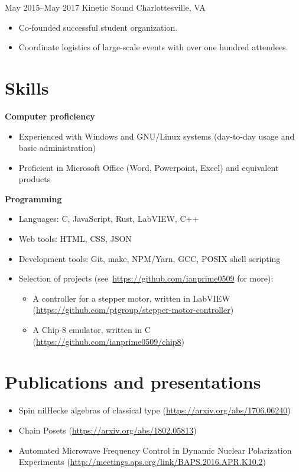 \documentclass[10pt]{article}
\begin{document}
{May 2015--May 2017}
{Kinetic Sound}
{Charlottesville, VA}
\begin{itemize}
\item Co-founded successful student organization.
\item Coordinate logistics of large-scale events with over one hundred attendees.
\end{itemize}

\section*{Skills}
\textbf{Computer proficiency}
\begin{itemize}
\item Experienced with Windows and GNU/Linux systems (day-to-day usage and
  basic administration)
\item Proficient in Microsoft Office (Word, Powerpoint, Excel) and equivalent
  products
\end{itemize}
\textbf{Programming}
\begin{itemize}
\item Languages: C, JavaScript, Rust, LabVIEW, C++
\item Web tools: HTML, CSS, JSON
\item Development tools: Git, make, NPM/Yarn, GCC, POSIX shell scripting
\item Selection of projects (see~\url{https://github.com/ianprime0509} for
  more):
  \begin{itemize}
  \item A controller for a stepper motor, written in LabVIEW
    (\url{https://github.com/ptgroup/stepper-motor-controller})
  \item A Chip-8 emulator, written in C
    (\url{https://github.com/ianprime0509/chip8})
  \end{itemize}
\end{itemize}

\section*{Publications and presentations}
\begin{itemize}
\item Spin nilHecke algebras of classical type
  (\url{https://arxiv.org/abs/1706.06240})
\item Chain Posets (\url{https://arxiv.org/abs/1802.05813})
\item Automated Microwave Frequency Control in Dynamic Nuclear Polarization
  Experiments (\url{http://meetings.aps.org/link/BAPS.2016.APR.K10.2})
\end{itemize}
\end{document}
